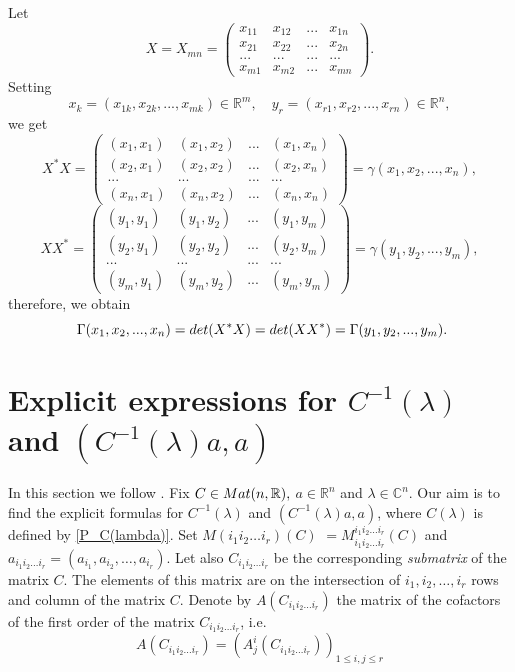 \documentclass[preprint,12pt]{elsarticle}
\numberwithin{equation}{section}
\begin{document}
Let 
\begin{equation}
\label{X(mn)}
X=X_{mn} =\left(
\begin{array}{cccc}
x_{11}&x_{12}&...&x_{1n}\\
x_{21}&x_{22}&...&x_{2n}\\
...   &...   &...&...\\
x_{m1}&x_{m2}&...&x_{mn}
\end{array}
\right).
\end{equation}
Setting 
\begin{equation}
\label{x_k,y_r=}
x_k=(x_{1k},x_{2k},...,x_{mk})\in{\mathbb R}^m,
\quad
y_r=(x_{r1},x_{r2},...,x_{rn})\in{\mathbb R}^n,
\end{equation}
we get
\begin{equation}
\label{X^*X}
X^*X=
 \left(
\begin{array}{cccc}
(x_1,x_1)&(x_1,x_2)&...&(x_1,x_n)\\
(x_2,x_1)&(x_2,x_2)&...&(x_2,x_n)\\
...   &...   &...&...\\
(x_n,x_1)&(x_n,x_2)&...&(x_n,x_n)
\end{array}
\right)=\gamma(x_1,x_2,..., x_n),
\end{equation}
\begin{equation}
\label{XX^*}
XX^*= \left(
\begin{array}{cccc}
(y_1,y_1)&(y_1,y_2)&...&(y_1,y_m)\\
(y_2,y_1)&(y_2,y_2)&...&(y_2,y_m)\\
...   &...   &...&...\\
(y_m,y_1)&(y_m,y_2)&...&(y_m,y_m)
\end{array}
\right)=\gamma(y_1,y_2,..., y_m),
\end{equation}
therefore, we obtain
\begin{equation}
 \label{d(X^*X)=d(XX^*)}\
\Gamma(x_1,x_2,..., x_n)={\rm det}(X^*X)={\rm det}(XX^*)=\Gamma(y_1,y_2,..., y_m).
\end{equation}

\section{Explicit expressions for $C^{-1}(\lambda)$ and  $(C^{-1}(\lambda)a,a)$}
In this section we follow \cite{Kos-hpl-arx20}.
Fix $C\in {\rm Mat}(n,\mathbb R),$ $a\in \mathbb R^n$ and $\lambda\in \mathbb C^n$. 
Our aim is to find the explicit formulas for  
$C^{-1}(\lambda)$ and  $(C^{-1}(\lambda)a,a)$, where $C(\lambda)$ is defined by \eqref{P_C(lambda)}.  
Set $M(i_1i_2\dots i_r)(C)$
$=M^{i_1i_2\dots i_r}_{i_1i_2\dots i_r}(C)$ and 
$a_{i_1i_2\dots i_r}=(a_{i_1},a_{i_2},\dots,a_{i_r})$.
Let also $C_{i_1i_2\dots i_r}$ be the corresponding {\it submatrix} of the matrix $C$.
The elements of this matrix are on the intersection of $i_1,i_2,\dots, i_r$ rows and column of the matrix $C$.
Denote by $A(C_{i_1i_2\dots i_r})$ the matrix of the cofactors of the first order of the matrix $C_{i_1i_2\dots i_r}$, i.e. 
\begin{equation}
\label{A(C)}
A(C_{i_1i_2\dots i_r})=(A^{i}_j(C_{i_1i_2\dots i_r}))_{1\leq i,j\leq r} 
\end{equation}
\end{document}
